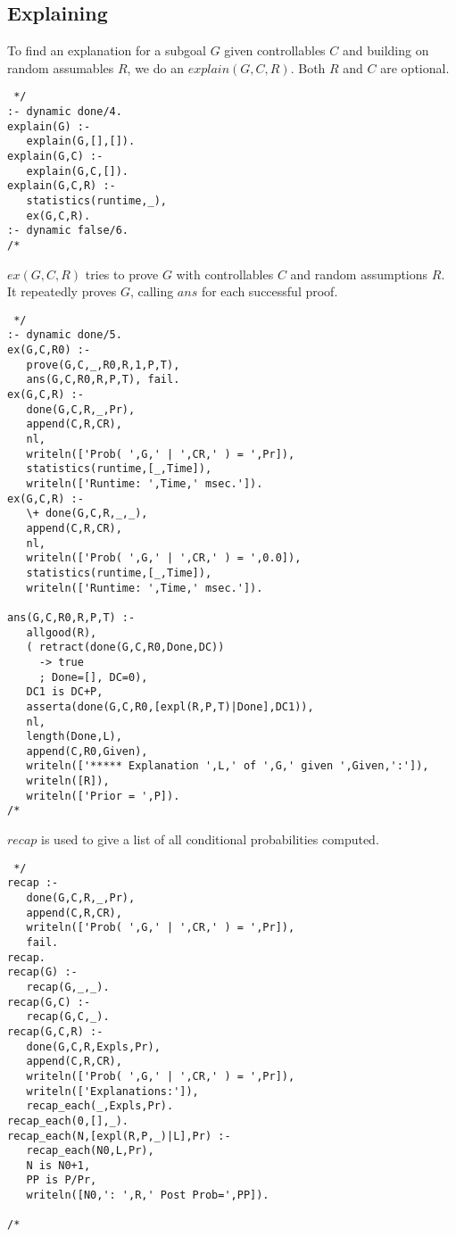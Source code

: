 \documentclass[11pt,fleqn]{article}
\begin{document}
\subsection{Explaining}
To find an explanation for a subgoal $G$ given controllables $C$ and
building on random assumables $R$, we do
an $explain(G,C,R)$. Both $R$ and $C$ are optional.
\begin{verbatim} */
:- dynamic done/4.
explain(G) :-
   explain(G,[],[]).
explain(G,C) :-
   explain(G,C,[]).
explain(G,C,R) :-
   statistics(runtime,_),
   ex(G,C,R).
:- dynamic false/6.
/* \end{verbatim}

$ex(G,C,R)$ tries to prove $G$ with controllables $C$ and random
assumptions $R$. It repeatedly proves $G$, calling $ans$ for each
successful proof.
\begin{verbatim} */
:- dynamic done/5.
ex(G,C,R0) :- 
   prove(G,C,_,R0,R,1,P,T), 
   ans(G,C,R0,R,P,T), fail.
ex(G,C,R) :-
   done(G,C,R,_,Pr),
   append(C,R,CR),
   nl,
   writeln(['Prob( ',G,' | ',CR,' ) = ',Pr]),
   statistics(runtime,[_,Time]),
   writeln(['Runtime: ',Time,' msec.']).
ex(G,C,R) :-
   \+ done(G,C,R,_,_),
   append(C,R,CR),
   nl,
   writeln(['Prob( ',G,' | ',CR,' ) = ',0.0]),
   statistics(runtime,[_,Time]),
   writeln(['Runtime: ',Time,' msec.']).

ans(G,C,R0,R,P,T) :-
   allgood(R),
   ( retract(done(G,C,R0,Done,DC))
     -> true
     ; Done=[], DC=0),
   DC1 is DC+P,
   asserta(done(G,C,R0,[expl(R,P,T)|Done],DC1)),
   nl,
   length(Done,L),
   append(C,R0,Given),
   writeln(['***** Explanation ',L,' of ',G,' given ',Given,':']),
   writeln([R]),
   writeln(['Prior = ',P]).
/* \end{verbatim}

$recap$ is used to give a list of all conditional probabilities computed.
\begin{verbatim} */
recap :-
   done(G,C,R,_,Pr),
   append(C,R,CR),
   writeln(['Prob( ',G,' | ',CR,' ) = ',Pr]),
   fail.
recap.
recap(G) :-
   recap(G,_,_).
recap(G,C) :-
   recap(G,C,_).
recap(G,C,R) :-
   done(G,C,R,Expls,Pr),
   append(C,R,CR),
   writeln(['Prob( ',G,' | ',CR,' ) = ',Pr]),
   writeln(['Explanations:']),
   recap_each(_,Expls,Pr).
recap_each(0,[],_).
recap_each(N,[expl(R,P,_)|L],Pr) :-
   recap_each(N0,L,Pr),
   N is N0+1,
   PP is P/Pr,
   writeln([N0,': ',R,' Post Prob=',PP]).
   
/* \end{verbatim}
\end{document}
